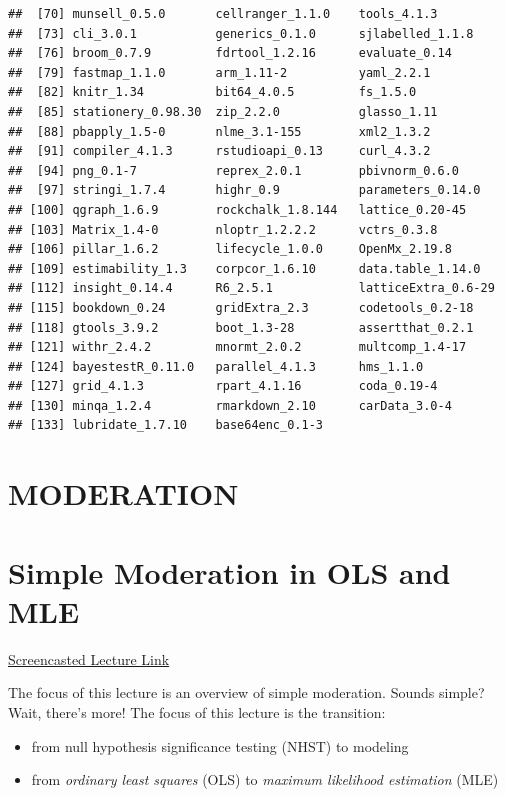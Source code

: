 \documentclass[
]{book}
\providecommand{\tightlist}{%
  \setlength{\itemsep}{0pt}\setlength{\parskip}{0pt}}
\begin{document}
\begin{verbatim}
##  [70] munsell_0.5.0       cellranger_1.1.0    tools_4.1.3        
##  [73] cli_3.0.1           generics_0.1.0      sjlabelled_1.1.8   
##  [76] broom_0.7.9         fdrtool_1.2.16      evaluate_0.14      
##  [79] fastmap_1.1.0       arm_1.11-2          yaml_2.2.1         
##  [82] knitr_1.34          bit64_4.0.5         fs_1.5.0           
##  [85] stationery_0.98.30  zip_2.2.0           glasso_1.11        
##  [88] pbapply_1.5-0       nlme_3.1-155        xml2_1.3.2         
##  [91] compiler_4.1.3      rstudioapi_0.13     curl_4.3.2         
##  [94] png_0.1-7           reprex_2.0.1        pbivnorm_0.6.0     
##  [97] stringi_1.7.4       highr_0.9           parameters_0.14.0  
## [100] qgraph_1.6.9        rockchalk_1.8.144   lattice_0.20-45    
## [103] Matrix_1.4-0        nloptr_1.2.2.2      vctrs_0.3.8        
## [106] pillar_1.6.2        lifecycle_1.0.0     OpenMx_2.19.8      
## [109] estimability_1.3    corpcor_1.6.10      data.table_1.14.0  
## [112] insight_0.14.4      R6_2.5.1            latticeExtra_0.6-29
## [115] bookdown_0.24       gridExtra_2.3       codetools_0.2-18   
## [118] gtools_3.9.2        boot_1.3-28         assertthat_0.2.1   
## [121] withr_2.4.2         mnormt_2.0.2        multcomp_1.4-17    
## [124] bayestestR_0.11.0   parallel_4.1.3      hms_1.1.0          
## [127] grid_4.1.3          rpart_4.1.16        coda_0.19-4        
## [130] minqa_1.2.4         rmarkdown_2.10      carData_3.0-4      
## [133] lubridate_1.7.10    base64enc_0.1-3
\end{verbatim}

\hypertarget{MOD}{%
\chapter*{MODERATION}\label{MOD}}

\hypertarget{SimpMod}{%
\chapter{Simple Moderation in OLS and MLE}\label{SimpMod}}

\href{https://spu.hosted.panopto.com/Panopto/Pages/Viewer.aspx?pid=cc098142-3693-4366-bb55-ad1d0175414e}{Screencasted Lecture Link}

The focus of this lecture is an overview of simple moderation. Sounds simple? Wait, there's more! The focus of this lecture is the transition:

\begin{itemize}
\tightlist
\item
  from null hypothesis significance testing (NHST) to modeling
\item
  from \emph{ordinary least squares} (OLS) to \emph{maximum likelihood estimation} (MLE)
\end{itemize}
\end{document}
